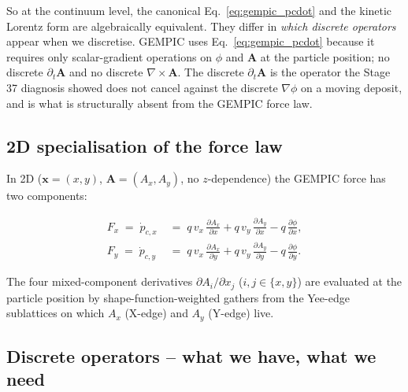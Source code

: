 \documentclass[11pt,a4paper]{article}
\newcommand{\vv}[1]{\mathbf{#1}}
\begin{document}
So at the continuum level, the canonical
Eq.~\eqref{eq:gempic_pcdot} and the kinetic Lorentz form are
algebraically equivalent.  They differ in \emph{which discrete
operators} appear when we discretise.  GEMPIC uses
Eq.~\eqref{eq:gempic_pcdot} because it requires only scalar-gradient
operations on $\phi$ and $\vv{A}$ at the particle position; no
discrete $\partial_t\vv{A}$ and no discrete $\nabla\times\vv{A}$.
The discrete $\partial_t\vv{A}$ is the operator the Stage 37
diagnosis showed does not cancel against the discrete $\nabla\phi$
on a moving deposit, and is what is structurally absent from the
GEMPIC force law.

\subsection{2D specialisation of the force law}

In 2D ($\vv{x} = (x, y)$, $\vv{A} = (A_x, A_y)$, no $z$-dependence)
the GEMPIC force has two components:
\begin{eqbox}
\begin{align}
F_x \;=\; \dot{p}_{c,x} &\;=\; q\,v_x\,\frac{\partial A_x}{\partial x}
                    + q\,v_y\,\frac{\partial A_y}{\partial x}
                    - q\,\frac{\partial \phi}{\partial x},
                    \label{eq:gempic_Fx}\\
F_y \;=\; \dot{p}_{c,y} &\;=\; q\,v_x\,\frac{\partial A_x}{\partial y}
                    + q\,v_y\,\frac{\partial A_y}{\partial y}
                    - q\,\frac{\partial \phi}{\partial y}.
                    \label{eq:gempic_Fy}
\end{align}
\end{eqbox}
The four mixed-component derivatives $\partial A_i / \partial x_j$
($i, j \in \{x, y\}$) are evaluated at the particle position by
shape-function-weighted gathers from the Yee-edge sublattices on
which $A_x$ (X-edge) and $A_y$ (Y-edge) live.

\subsection{Discrete operators -- what we have, what we need}
\end{document}
